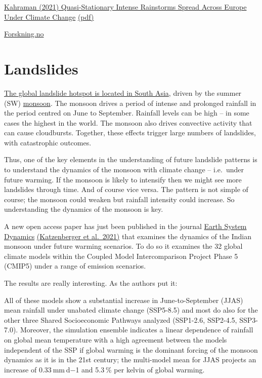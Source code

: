 \documentclass[
]{book}
\begin{document}
\href{https://agupubs.onlinelibrary.wiley.com/doi/full/10.1029/2020GL092361}{Kahraman (2021) Quasi-Stationary Intense Rainstorms Spread Across Europe Under Climate Change}
\href{pdf/Kahraman_2021_Quasistationary_Rainstorms.pdf}{(pdf)}

\href{https://forskning.no/klima-vaer-og-vind/klimaendringer-vil-fore-til-mer-intenst-regnvaer-som-beveger-seg-sakte-over-europa/1892814}{Forskning.no}

\hypertarget{landslides}{%
\section{Landslides}\label{landslides}}

\href{https://blogs.agu.org/landslideblog/2018/08/24/global-fatal-landslide-occurrence-1/}{The global landslide hotspot is located in South Asia}, driven by the summer (SW) \href{https://blogs.agu.org/landslideblog/?s=monsoon\&submit.x=0\&submit.y=0\&mswhere=blog}{monsoon}. The monsoon drives a period of intense and prolonged rainfall in the period centred on June to September. Rainfall levels can be high -- in some cases the highest in the world. The monsoon also drives convective activity that can cause cloudbursts. Together, these effects trigger large numbers of landslides, with catastrophic outcomes.

Thus, one of the key elements in the understanding of future landslide patterns is to understand the dynamics of the monsoon with climate change -- i.e.~under future warming. If the monsoon is likely to intensify then we might see more landslides through time. And of course vice versa. The pattern is not simple of course; the monsoon could weaken but rainfall intensity could increase. So understanding the dynamics of the monsoon is key.

A new open access paper has just been published in the journal \href{https://www.earth-system-dynamics.net/}{Earth System Dynamics} \href{https://esd.copernicus.org/articles/12/367/2021/}{(Katzenberger et al.~2021)} that examines the dynamics of the Indian monsoon under future warming scenarios. To do so it examines the 32 global climate models within the Coupled Model Intercomparison Project Phase 5 (CMIP5) under a range of emission scenarios.

The results are really interesting. As the authors put it:

All of these models show a substantial increase in June-to-September (JJAS) mean rainfall under unabated climate change (SSP5-8.5) and most do also for the other three Shared Socioeconomic Pathways analyzed (SSP1-2.6, SSP2-4.5, SSP3-7.0). Moreover, the simulation ensemble indicates a linear dependence of rainfall on global mean temperature with a high agreement between the models independent of the SSP if global warming is the dominant forcing of the monsoon dynamics as it is in the 21st century; the multi-model mean for JJAS projects an increase of 0.33 mm d−1 and 5.3 \% per kelvin of global warming.
\end{document}
